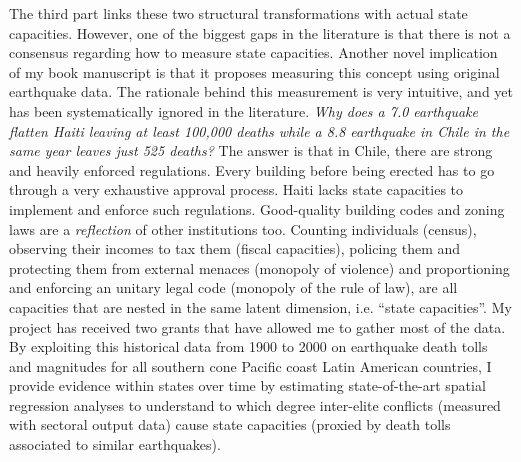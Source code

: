 \documentclass[11pt]{letter} %
\begin{document}
\begin{letter}{}

The third part links these two structural transformations with actual state capacities. However, one of the biggest gaps in the literature is that there is not a consensus regarding how to measure state capacities. Another novel implication of my book manuscript is that it proposes measuring this concept using original earthquake data. The rationale behind this measurement is very intuitive, and yet has been systematically ignored in the literature. \emph{Why does a 7.0 earthquake flatten Haiti leaving at least 100,000 deaths while a 8.8 earthquake in Chile in the same year leaves just 525 deaths?} The answer is that in Chile, there are strong and heavily enforced regulations. Every building before being erected has to go through a very exhaustive approval process. Haiti lacks state capacities to implement and enforce such regulations. Good-quality building codes and zoning laws are a \emph{reflection} of other institutions too. Counting individuals (census), observing their incomes to tax them (fiscal capacities), policing them and protecting them from external menaces (monopoly of violence) and proportioning and enforcing an unitary legal code (monopoly of the rule of law), are all capacities that are nested in the same latent dimension, i.e. ``state capacities''. My project has received two grants that have allowed me to gather most of the data. By exploiting this historical data from 1900 to 2000 on earthquake death tolls and magnitudes for all southern cone Pacific coast Latin American countries, I provide evidence within states over time by estimating state-of-the-art spatial regression analyses to understand to which degree inter-elite conflicts (measured with sectoral output data) cause state capacities (proxied by death tolls associated to similar earthquakes). 


\end{letter}
\end{document}

